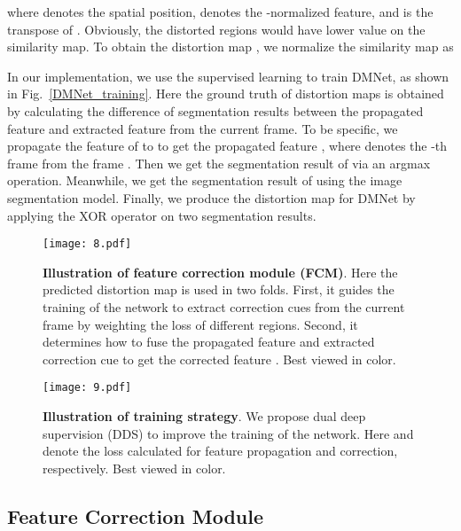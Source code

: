 \documentclass[journal]{IEEEtran}
\begin{document}
where  denotes the spatial position,  denotes the -normalized feature, and  is the transpose of . Obviously, the distorted regions would have lower value on the similarity map. To obtain the distortion map , we normalize the similarity map as 



In our implementation, we use the supervised learning to train DMNet, as shown in Fig.~\ref{DMNet_training}. Here the ground truth of distortion maps is obtained by calculating the difference of segmentation results between the propagated feature and extracted feature from the current frame. To be specific, we propagate the feature of  to  to get the propagated feature , where  denotes the -th frame from the frame . Then we get the segmentation result of  via an argmax operation. Meanwhile, we get the segmentation result of  using the image segmentation model. 
Finally, we produce the distortion map  for DMNet by applying the XOR operator on two segmentation results.


\begin{figure}[t]
	\begin{center}
		\texttt{[image: 8.pdf]}
	\end{center}
	\caption{\textbf{Illustration of feature correction module (FCM)}. Here the predicted distortion map  is used in two folds. First, it guides the training of the network to extract correction cues from the current frame by weighting the loss of different regions. Second, it determines how to fuse the propagated feature   and extracted correction cue  to get the corrected feature . Best viewed in color.}
	\label{FCM}
\end{figure}


\begin{figure}[t]
	\begin{center}
		\texttt{[image: 9.pdf]}
	\end{center}
	\caption{\textbf{Illustration of training strategy}. We propose dual deep supervision (DDS) to improve the training of the network. Here  and  denote the loss calculated for feature propagation and correction, respectively. Best viewed in color.}
	\label{framework_training}
\end{figure}

\subsection{Feature Correction Module}
\end{document}
